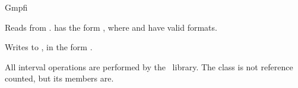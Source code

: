 \begin{ccRefClass} {Gmpfi}



        {Reads  from .  has the form
        , where  and  have valid
         formats.}

        {Writes  to , in the form .}


\ccImplementation
All interval operations are performed by the \mpfi~library. The class
 is not reference counted, but its members are.

\ccSeeAlso
{}\\
\\
\\
\\
\\

\end{ccRefClass}
